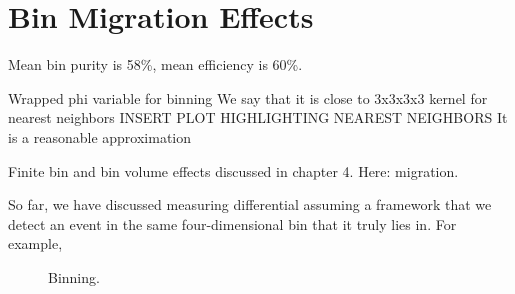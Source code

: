 \section{Bin Migration Effects}

    
    
    Mean bin purity is 58\%, mean efficiency is 60\%. 

    Wrapped phi variable for binning
    We say that it is close to 3x3x3x3 kernel for nearest neighbors
    INSERT PLOT HIGHLIGHTING NEAREST NEIGHBORS
    It is a reasonable approximation
    
    
    Finite bin and bin volume effects discussed in chapter 4. Here: migration. 
    
    So far, we have discussed measuring differential \xsecs assuming a framework that we detect an event in the same four-dimensional bin that it truly lies in. For example,


    
    \begin{figure}[H]
        \centering
        \hfill
        
        \caption[Binning]{Binning. }\label{fig:mig_ex}
    \end{figure}
    
